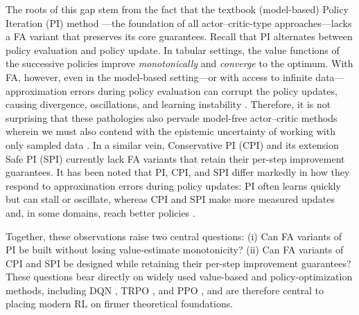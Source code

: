 \documentclass[twoside]{article}
\theoremstyle{plain}
\theoremstyle{definition}
\theoremstyle{remark}
\begin{document}
The roots of this gap stem from the fact that the textbook (model-based) Policy Iteration (PI) method \citep{howard1960dynamic}---the foundation of all actor–critic-type approaches---lacks a FA variant that preserves its core guarantees. Recall that PI alternates between policy evaluation and policy update. In tabular settings, the value functions of the successive policies improve \textit{monotonically} and \textit{converge} to the optimum. With FA, however, even in the model-based setting---or with access to infinite data---approximation errors during policy evaluation can corrupt the policy updates, causing  divergence, oscillations, and learning instability \citep{bertsekas2011approximate}. Therefore, it is not surprising that these pathologies also pervade model-free actor–critic methods wherein we  must also contend with the epistemic uncertainty of working with only sampled data  \citep{thrun1993issues,van2016deep,td3}. In a similar vein, Conservative PI (CPI) \citep{kakade2002approximately} and its extension Safe PI (SPI) \citep{metelli2021safe} currently lack FA variants that retain their per-step improvement guarantees. It has been noted that PI, CPI, and SPI differ markedly in how they respond to approximation errors during policy updates: PI often learns quickly but can stall or oscillate, whereas CPI and SPI make more measured updates and, in some domains, reach better policies \citep{metelli2021safe}. 

Together, these observations raise two central questions: (i) Can FA variants of PI be built without losing value-estimate monotonicity? (ii) Can FA variants of CPI and SPI be designed while retaining their per-step improvement guarantees? These questions bear directly on widely used value-based and policy-optimization methods, including DQN \citep{dqn}, TRPO \citep{trpo}, and PPO \citep{schulman2017proximal}, and are therefore central to placing modern RL on firmer theoretical foundations.
\end{document}
